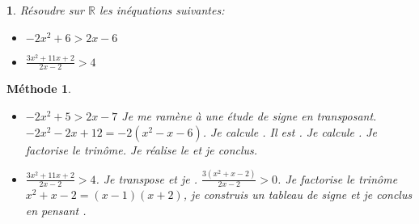 \documentclass{beamer}
\newtheorem{exercise}[theorem]{\translate{Exercise}}
\newtheorem{methode}[theorem]{{Méthode}}
\begin{document}
   \begin{frame}
  \begin{exercise}
    Résoudre sur $\mathbb{R}$ les inéquations suivantes:
    \begin{itemize}
      \item $-2x^2+6>2x-6$
     \item $\frac{3x^2+11x+2}{2x-2}>4$
   \end{itemize}    
  \end{exercise} 
  \end{frame}
  
  \begin{frame}
  \begin{methode}
    \begin{itemize}
      \item $-2x^2+5>2x-7$ Je me ramène à une étude de signe en transposant.
      $-2x^2-2x+12=-2(x^2-x-6)$. Je calcule . Il
      est . Je calcule .
      Je  {factorise} le trinôme. Je réalise le  et
      je conclus.
     
      \item $\frac{3x^2+11x+2}{2x-2}>4$. Je transpose et je 
      .
    $\frac{3(x^2+x-2)}{2x-2}>0$. Je factorise le trinôme 
    $x^2+x-2=(x-1)(x+2)$, je construis un tableau de signe et je conclus en pensant
    .
   \end{itemize}    
  \end{methode} 
  \end{frame}


  
\end{document}
